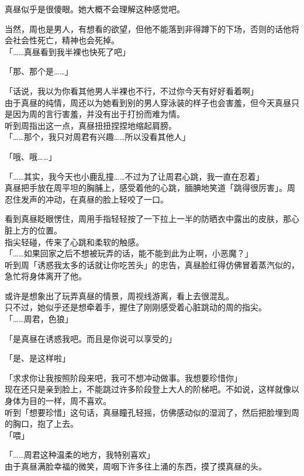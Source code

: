真昼似乎是很傻眼。她大概不会理解这种感觉吧。

当然，周也是男人，有想看的欲望，但他不能落到非得蹲下的下场，否则的话他将会社会性死亡，精神也会死掉。\\

「……真昼看到我半裸也快死了吧」

「那、那个是……」

「话说，我以为你看其他男人半裸也不行，不过你今天有好好看着啊」\\

由于真昼的纯情，周还以为她看到别的男人穿泳装的样子也会害羞，但今天真昼只是因为周的言行害羞，并没有出于打扮而难为情。\\

听到周指出这一点，真昼扭扭捏捏地缩起肩膀。\\

「……那个，我只对周君有兴趣……所以没看其他人」

「哦、哦……」

「……其实，我今天也小鹿乱撞……不过为了让周君心跳，我一直在忍着」\\

真昼把手放在周平坦的胸脯上，感受着他的心跳，腼腆地笑道「跳得很厉害」。周忍住发声的冲动，在真昼的脸上轻咬了一口。

看到真昼眨眼愣住，周用手指轻轻按了一下拉上一半的防晒衣中露出的皮肤，那心脏上方的位置。\\

指尖轻碰，传来了心跳和柔软的触感。\\

「……如果回家之后不想被玩弄的话，能不能到此为止啊，小恶魔？」\\

听到周「诱惑我太多的话就让你吃苦头」的忠告，真昼脸红得仿佛冒着蒸汽似的，急忙将身体离开了他。

或许是想象出了玩弄真昼的情景，周视线游离，看上去很混乱。\\

只不过，她似乎还是想牵着手，握住了刚刚感受着心脏跳动的周的指尖。\\

「……周君，色狼」

「是真昼在诱惑我吧。而且是你说可以享受的」

「是、是这样啦」

「求求你让我按照阶段来吧，我可不想冲动做事。我想要珍惜你」\\

现在还只是亲到脸上，不能跳过许多阶段登上大人的阶梯吧。不如说，这样就像以身体为目的一样，周不喜欢。\\

听到「想要珍惜」这句话，真昼瞳孔轻摇，仿佛感动似的湿润了，然后把脸埋到周的胸口，抱了上去。\\

「喂」

「……周君这种温柔的地方，我特别喜欢」\\

由于真昼满脸幸福的微笑，周咽下许多往上涌的东西，摸了摸真昼的头。
